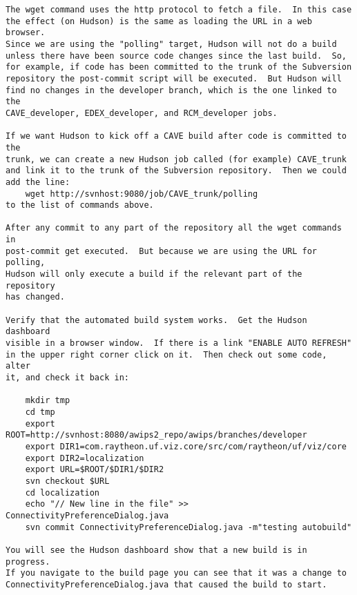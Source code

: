 \begin{verbatim}
The wget command uses the http protocol to fetch a file.  In this case
the effect (on Hudson) is the same as loading the URL in a web browser.
Since we are using the "polling" target, Hudson will not do a build
unless there have been source code changes since the last build.  So,
for example, if code has been committed to the trunk of the Subversion
repository the post-commit script will be executed.  But Hudson will
find no changes in the developer branch, which is the one linked to the
CAVE_developer, EDEX_developer, and RCM_developer jobs.

If we want Hudson to kick off a CAVE build after code is committed to the
trunk, we can create a new Hudson job called (for example) CAVE_trunk
and link it to the trunk of the Subversion repository.  Then we could
add the line:
    wget http://svnhost:9080/job/CAVE_trunk/polling
to the list of commands above.

After any commit to any part of the repository all the wget commands in
post-commit get executed.  But because we are using the URL for polling,
Hudson will only execute a build if the relevant part of the repository
has changed.

Verify that the automated build system works.  Get the Hudson dashboard
visible in a browser window.  If there is a link "ENABLE AUTO REFRESH"
in the upper right corner click on it.  Then check out some code, alter
it, and check it back in:

    mkdir tmp
    cd tmp
    export ROOT=http://svnhost:8080/awips2_repo/awips/branches/developer
    export DIR1=com.raytheon.uf.viz.core/src/com/raytheon/uf/viz/core
    export DIR2=localization
    export URL=$ROOT/$DIR1/$DIR2
    svn checkout $URL
    cd localization
    echo "// New line in the file" >> ConnectivityPreferenceDialog.java
    svn commit ConnectivityPreferenceDialog.java -m"testing autobuild"

You will see the Hudson dashboard show that a new build is in progress.
If you navigate to the build page you can see that it was a change to
ConnectivityPreferenceDialog.java that caused the build to start.

\end{verbatim}

